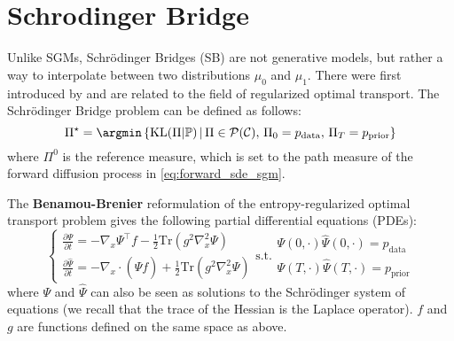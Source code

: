 \documentclass{article}
\begin{document}
\section{Schrodinger Bridge}

Unlike SGMs, Schrödinger Bridges (SB) are not generative models, but rather a way to interpolate between two distributions $\mu_0$ and $\mu_1$.
There were first introduced by \citet{schrodinger1932theorie} and are related to the field of regularized optimal transport.
The Schrödinger Bridge problem can be defined as follows:
\begin{equation*}
    \Pi^\star = \argmin\braces{\mathrm{KL}(\Pi|\mathbb{P}) \, | \, \Pi \in \mathcal{P}(\mathcal{C}), \, \Pi_0 = p_{\textrm{data}}, \, \Pi_T = p_{\textrm{prior}}}
\end{equation*}
where $\Pi^0$ is the reference measure, which is set to the path measure of the forward diffusion process in \eqref{eq:forward_sde_sgm}.

The \textbf{Benamou-Brenier} reformulation of the entropy-regularized optimal transport problem gives the following partial differential equations (PDEs):
\begin{equation}
    \label{eq:sb_pdes}
    \begin{cases}
    \frac{\partial \Psi}{\partial t} = -\nabla_x \Psi^\top f - \frac{1}{2}\mathrm{Tr}(g^2 \nabla_x^2 \Psi) \\
    \frac{\partial \widehat{\Psi}}{\partial t} = -\nabla_x \cdot (\widehat{\Psi} f) + \frac{1}{2}\mathrm{Tr}(g^2 \nabla_x^2 \widehat{\Psi})
    \end{cases}
    \mathrm{s.t.}
    \begin{array}{l}
        \Psi(0, \cdot) \widehat{\Psi}(0, \cdot) = p_\mathrm{data}\\
        \Psi(T, \cdot) \widehat{\Psi}(T, \cdot) = p_\mathrm{prior}
    \end{array}
\end{equation}
where $\Psi$ and $\widehat\Psi$ can also be seen as solutions to the Schrödinger system of equations (we recall that the trace of the Hessian is the Laplace operator). $f$ and $g$ are functions defined on the same space as above.
\end{document}
